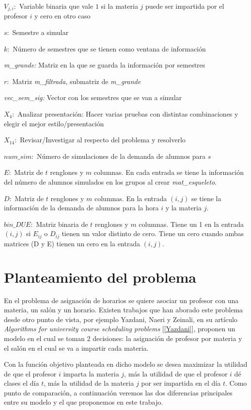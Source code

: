 $V_{j,i}:$ Variable binaria que vale $1$ si la materia $j$ puede ser impartida por  el profesor $i$ y cero en otro caso

$s:$ Semestre a simular

$k:$ Número de semestres que se tienen como ventana de información

\textit{m\_grande:} Matriz en la que se guarda la información por semestres

$r:$ Matriz \textit{m\_filtrada}, submatriz de \textit{m\_grande}

\textit{vec\_sem\_sig:} Vector con los semestres que se van a simular

$X_{4}:$ Analizar presentación: Hacer varias pruebas con distintas combinaciones y elegir el mejor estilo/presentación

$X_{14}:$ Revisar/Investigar al respecto del problema y resolverlo

$num\_sim:$ Número de simulaciones de la demanda de alumnos para $s$
  
  $E:$ Matriz de $t$ renglones y $m$ columnas. En cada entrada se tiene la información del número de alumnos simulados en los grupos al crear \textit{mat\_esqueleto}.

$D:$ Matriz de $t$ renglones y $m$ columnas. En la entrada $(i,j)$ se tiene la información de la demanda de alumnos para la hora $i$ y la materia $j$.

$bin\_DUE:$ Matriz binaria de $t$ renglones y $m$ columnas. Tiene un 1 en la entrada $(i,j)$ si $E_{ij}$ o $D_{ij}$ tienen un valor distinto de cero. Tiene un cero cuando ambas matrices (D y E) tienen un cero en la entrada $(i,j)$.

  
  
  \section{Planteamiento del problema}

En el problema de asignación de horarios se quiere asociar un profesor con una materia, un salón y un horario. Existen trabajos que han aborado este problema desde otro punto de vista, por ejemplo Yazdani, Naeri y Zeinali, en su artículo \textit{Algorithms for university course scheduling problems} [\ref{Yazdani}], proponen un modelo en el cual se toman 2 decisiones: la asignación de profesor por materia y el salón en el cual se va a impartir cada materia.

Con la función objetivo planteada en dicho modelo se desea maximizar la utilidad de que el profesor $i$ imparta la materia $j$, más la utilidad de que el profesor $i$ dé clases el día $t$, más la utilidad de la materia $j$ por ser impartida en el día $t$. Como punto de comparación, a continuación veremos las dos diferencias principales entre su modelo y el que proponemos en este trabajo.

